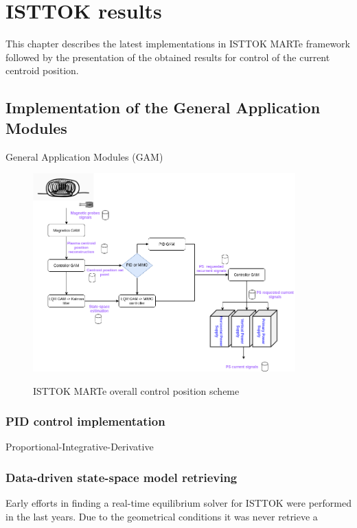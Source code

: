 \chapter{ISTTOK  results }

This chapter describes the latest implementations in ISTTOK MARTe framework followed by the presentation of the obtained results for control of the current centroid position.

\section{Implementation of the General Application Modules }

General Application Modules (GAM) 

\begin{figure}
	\centering
	\includegraphics[width=0.9\textwidth]{Chp5/GAMsDiagram.png}
	\label{GAMsDiag}
	\caption{ISTTOK MARTe overall control position  scheme}
\end{figure}

\subsection{PID control implementation}

Proportional-Integrative-Derivative

\subsection{Data-driven state-space model retrieving }

Early efforts in finding a real-time equilibrium solver for ISTTOK were performed in the last years. Due to the geometrical conditions it was never retrieve a 

